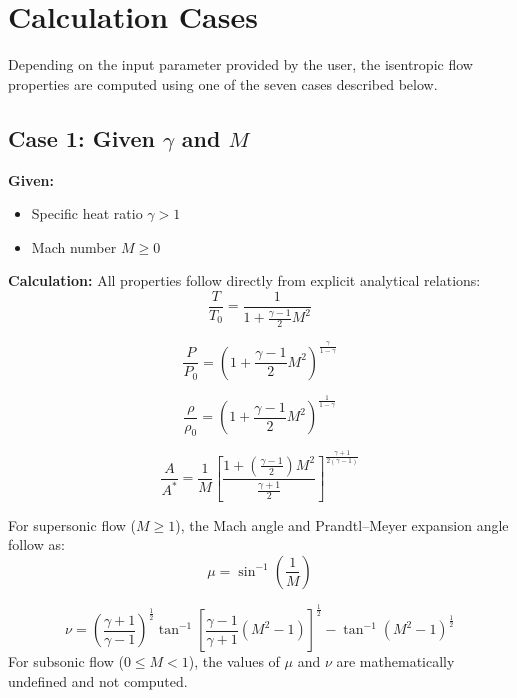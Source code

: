 \section{Calculation Cases}

Depending on the input parameter provided by the user, the isentropic flow properties are computed using one of the seven cases described below.

\subsection*{Case 1: Given $\gamma$ and $M$}

\textbf{Given:}
\begin{itemize}[nosep]
    \item Specific heat ratio $\gamma > 1$
    \item Mach number $M \ge 0$
\end{itemize}

\textbf{Calculation:} All properties follow directly from explicit analytical relations:
\begin{equation}
\frac{T}{T_0} = \frac{1}{1 + \frac{\gamma-1}{2}M^2}
\end{equation}

\begin{equation}
\frac{P}{P_0} = \left(1 + \frac{\gamma-1}{2}M^2\right)^{\frac{\gamma}{1-\gamma}}
\end{equation}

\begin{equation}
\frac{\rho}{\rho_0} = \left(1 + \frac{\gamma-1}{2}M^2\right)^{\frac{1}{1-\gamma}}
\end{equation}

\begin{equation}
\frac{A}{A^*} = \frac{1}{M}\left[\frac{1+\left(\frac{\gamma-1}{2}\right)M^2}{\frac{\gamma+1}{2}}\right]^{\frac{\gamma+1}{2(\gamma-1)}}
\end{equation}

For supersonic flow ($M \ge 1$), the Mach angle and Prandtl--Meyer expansion angle follow as:
\begin{equation}
\mu = \sin^{-1}\left(\frac{1}{M}\right)
\end{equation}

\begin{equation}
\nu = \left(\frac{\gamma+1}{\gamma-1}\right)^{\frac{1}{2}}\tan^{-1}\left[\frac{\gamma-1}{\gamma+1}(M^2-1)\right]^{\frac{1}{2}} - \tan^{-1}(M^2-1)^{\frac{1}{2}}
\end{equation}
For subsonic flow ($0 \le M < 1$), the values of $\mu$ and $\nu$ are mathematically undefined and not computed.


